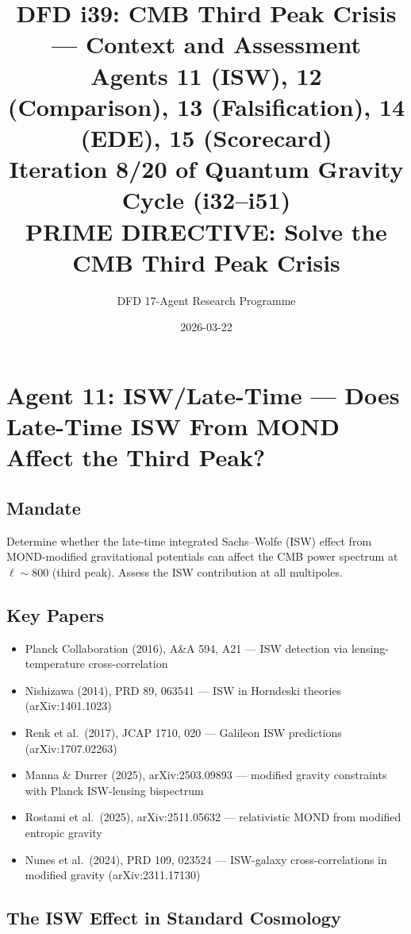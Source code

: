 \documentclass[11pt,a4paper]{article}
\title{DFD i39: CMB Third Peak Crisis --- Context and Assessment\\[6pt]
\large Agents 11 (ISW), 12 (Comparison), 13 (Falsification), 14 (EDE), 15 (Scorecard)\\[6pt]
\normalsize Iteration 8/20 of Quantum Gravity Cycle (i32--i51)\\
PRIME DIRECTIVE: Solve the CMB Third Peak Crisis}
\author{DFD 17-Agent Research Programme}
\date{2026-03-22}
\begin{document}
\maketitle
\tableofcontents
\newpage

\section{Agent 11: ISW/Late-Time --- Does Late-Time ISW From MOND Affect the Third Peak?}
\label{sec:agent11}

\subsection{Mandate}

Determine whether the late-time integrated Sachs--Wolfe (ISW) effect from MOND-modified gravitational potentials can affect the CMB power spectrum at $\ell \sim 800$ (third peak). Assess the ISW contribution at all multipoles.

\subsection{Key Papers}

\begin{itemize}
\item Planck Collaboration (2016), A\&A 594, A21 --- ISW detection via lensing-temperature cross-correlation
\item Nishizawa (2014), PRD 89, 063541 --- ISW in Horndeski theories (arXiv:1401.1023)
\item Renk et al.\ (2017), JCAP 1710, 020 --- Galileon ISW predictions (arXiv:1707.02263)
\item Manna \& Durrer (2025), arXiv:2503.09893 --- modified gravity constraints with Planck ISW-lensing bispectrum
\item Rostami et al.\ (2025), arXiv:2511.05632 --- relativistic MOND from modified entropic gravity
\item Nunes et al.\ (2024), PRD 109, 023524 --- ISW-galaxy cross-correlations in modified gravity (arXiv:2311.17130)
\end{itemize}

\subsection{The ISW Effect in Standard Cosmology}
\end{document}

